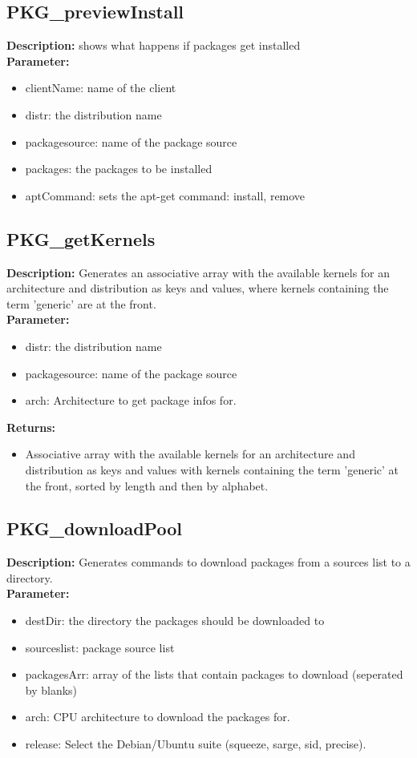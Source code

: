 \subsection{PKG\_previewInstall}
\textbf{Description:} shows what happens if packages get installed\\
\textbf{Parameter:}
\begin{itemize}
\item clientName: name of the client
\item distr: the distribution name
\item packagesource: name of the package source
\item packages: the packages to be installed
\item aptCommand: sets the apt-get command: install, remove
\end{itemize}

\subsection{PKG\_getKernels}
\textbf{Description:} Generates an associative array with the available kernels for an architecture and distribution as keys and values, where kernels containing the term 'generic' are at the front.\\
\textbf{Parameter:}
\begin{itemize}
\item distr: the distribution name
\item packagesource: name of the package source
\item arch: Architecture to get package infos for.
\end{itemize}
\textbf{Returns:}
\begin{itemize}
\item Associative array with the available kernels for an architecture and distribution as keys and values with kernels containing the term 'generic' at the front, sorted by length and then by alphabet.
\end{itemize}

\subsection{PKG\_downloadPool}
\textbf{Description:} Generates commands to download packages from a sources list to a directory.\\
\textbf{Parameter:}
\begin{itemize}
\item destDir: the directory the packages should be downloaded to
\item sourceslist: package source list
\item packagesArr: array of the lists that contain packages to download (seperated by blanks)
\item arch: CPU architecture to download the packages for.
\item release: Select the Debian/Ubuntu suite (squeeze, sarge, sid, precise).
\end{itemize}

